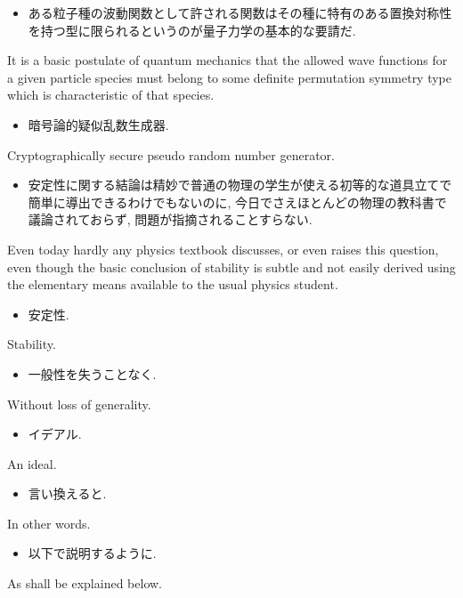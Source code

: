 \documentclass[openany, a4paper, oneside]{jsbook}
\begin{document}
\begin{itemize}
\item ある粒子種の波動関数として許される関数はその種に特有のある置換対称性を持つ型に限られるというのが量子力学の基本的な要請だ. \cite{LiebSeiringer1}
\end{itemize}
It is a basic postulate of quantum mechanics that the allowed wave functions for a given particle species
must belong to some definite permutation symmetry type which is characteristic of that species.

\begin{itemize}
\item 暗号論的疑似乱数生成器.
\end{itemize}
Cryptographically secure pseudo random number generator.

\begin{itemize}
\item 安定性に関する結論は精妙で普通の物理の学生が使える初等的な道具立てで簡単に導出できるわけでもないのに,
今日でさえほとんどの物理の教科書で議論されておらず, 問題が指摘されることすらない. \cite{LiebSeiringer1}
\end{itemize}
Even today hardly any physics textbook discusses, or even raises this question,
even though the basic conclusion of stability is subtle and not easily derived
using the elementary means available to the usual physics student.

\begin{itemize}
\item 安定性.
\end{itemize}
Stability.

\begin{itemize}
\item 一般性を失うことなく.
\end{itemize}
Without loss of generality.

\begin{itemize}
\item イデアル.
\end{itemize}
An ideal.

\begin{itemize}
\item 言い換えると.
\end{itemize}
In other words.

\begin{itemize}
\item 以下で説明するように. \cite{LiebSeiringer1}
\end{itemize}
As shall be explained below.
\end{document}
